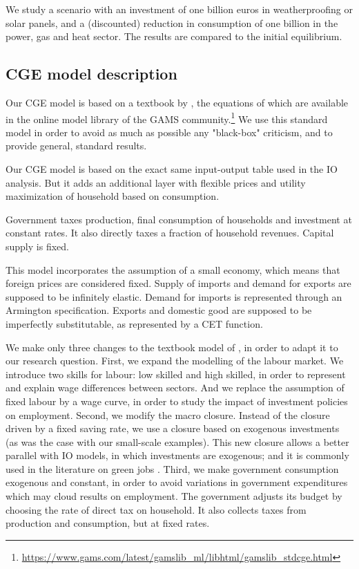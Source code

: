 We study a scenario with an investment of one billion euros in weatherproofing or solar panels, and a (discounted) reduction in consumption of one billion in the power, gas and heat sector.
The results are compared to the initial equilibrium. 


\subsection{CGE model description}
Our CGE model is based on a textbook by \citet{Hosoe2010}, the equations of which are available in the online model library of the GAMS community.\footnote{\url{https://www.gams.com/latest/gamslib\_ml/libhtml/gamslib\_stdcge.html}}
We use this standard model in order to avoid as much as possible any "black-box" criticism, and to provide general, standard results.

Our CGE model is based on the exact same input-output table used in the IO analysis. But it adds an additional layer with flexible prices and utility maximization of household based on consumption.

Government taxes production, final consumption of households and investment at constant rates.  It also directly taxes a fraction of household revenues. Capital supply is fixed. 

This model incorporates the assumption of a small economy, which means that foreign prices are considered fixed. Supply of imports and demand for exports are supposed to be infinitely elastic.
Demand for imports is represented through an Armington specification. Exports and domestic good are supposed to be imperfectly substitutable, as represented by a CET function.

We make only three changes to the textbook model of \citet{Hosoe2010}, in order to adapt it to our research question. 
First, we expand the modelling of the labour market. We introduce two skills for labour: low skilled and high skilled, in order to represent and explain wage differences between sectors. And we replace the assumption of fixed labour by a wage curve, in order to study the impact of investment policies on employment.
Second, we modify the macro closure. Instead of the closure driven by a fixed saving rate, we use a closure based on exogenous investments (as was the case with our small-scale examples). This new closure allows a better parallel with IO models, in which investments are exogenous; and it is commonly used in the literature on green jobs \citep{Lehr2008,Lehr2012}.
Third, we make government consumption exogenous and constant, in order to avoid variations in government expenditures which may cloud results on employment. The government adjusts its budget by choosing the rate of direct tax on household. It also collects taxes from production and consumption, but at fixed rates.

